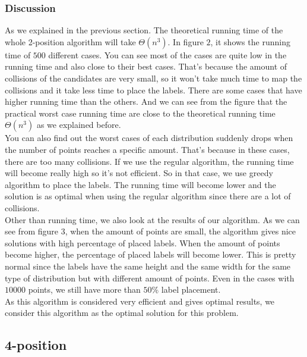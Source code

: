 \documentclass[crop=false,a4paper,oneside,11pt]{standalone}
\begin{document}
\subsubsection{Discussion}
As we explained in the previous section. The theoretical running time of the whole 2-position algorithm will take $\Theta(n^3)$. In figure $2$, it shows the running time of $500$ different cases. You can see most of the cases are quite low in the running time and also close to their best cases. That's because the amount of collisions of the candidates are very small, so it won't take much time to map the collisions and it take less time to place the labels. There are some cases that have higher running time than the others. And we can see from the figure that the practical worst case running time are close to the theoretical running time $\Theta(n^3)$ as we explained before. \\
You can also find out the worst cases of each distribution suddenly drops when the number of points reaches a specific amount. That's because in these cases, there are too many collisions. If we use the regular algorithm, the running time will become really high so it's not efficient. So in that case, we use greedy algorithm to place the labels. The running time will become lower and the solution is as optimal when using the regular algorithm since there are a lot of collisions.\\
Other than running time, we also look at the results of our algorithm. As we can see from figure $3$, when the amount of points are small, the algorithm gives nice solutions with high percentage of placed labels. When the amount of points become higher, the percentage of placed labels will become lower. This is pretty normal since the labels have the same height and the same width for the same type of distribution but with different amount of points. Even in the cases with $10000$ points, we still have more than $50\%$ label placement. \\
As this algorithm is considered very efficient and gives optimal results, we consider this algorithm as the optimal solution for this problem.

\subsection{4-position}
\end{document}
